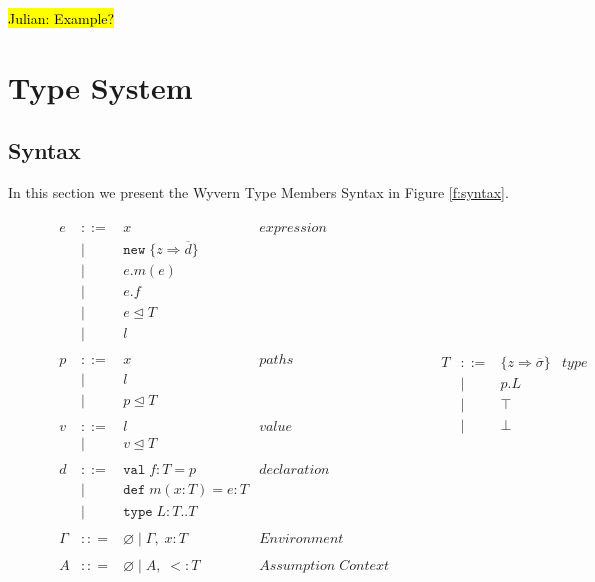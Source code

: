 \documentclass[a4paper,UKenglish]{lipics}
\begin{document}
\hl{Julian: Example?}


\section{Type System}

\subsection{Syntax} \label{s:syntax}
In this section we present the Wyvern Type Members Syntax 
in Figure \ref{f:syntax}. 

\begin{figure}[h]
\[
\begin{array}{lll}
\begin{array}{lllr}
e & ::= & x & expression \\
& | & \texttt{new} \; \{z \Rightarrow \overline{d}\}&\\
& | & e.m(e) &\\
& | & e.f &\\
& | & e \unlhd T&\\
& | & l &\\
&&\\
p & ::= & x & paths \\
& | & l &\\
& | & p \unlhd T &\\
&&\\
v & ::= & l & value \\
& | & v \unlhd T &\\
&&\\
d & ::= & \texttt{val} \; f : T = p & declaration \\
  & |   & \texttt{def} \; m(x:T) = e : T &\\
  & |   & \texttt{type} \; L : T .. T&\\
&&\\
\Gamma & :: = & \varnothing \; | \; \Gamma,\; x : T & Environment \\
&&\\
A & :: = & \varnothing \; | \; A,\;  <: T & Assumption \; Context \\
 \end{array}
& ~~~~~~
&
\begin{array}{lllr}
T & ::= & \{z \Rightarrow \overline{\sigma}\} & type \\
& | & p.L &\\
& | & \top & \\
& | & \bot & \\
&&\\

\end{array}
\end{array}\]
\end{figure}
\end{document}

